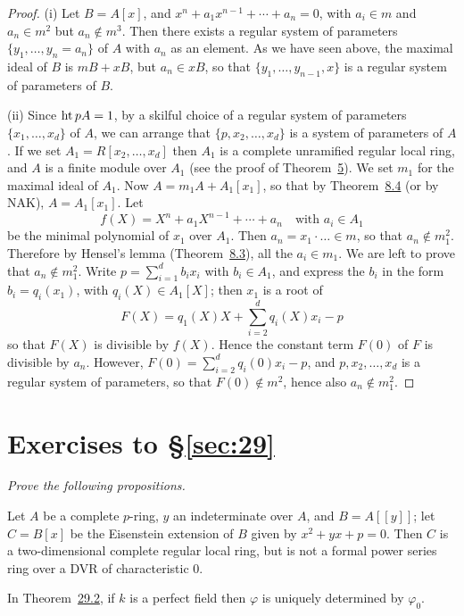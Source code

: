 \begin{proof}
(i) Let $B = A[x]$, and $x^n + a_1x^{n-1} + \cdots + a_n = 0$, with $a_i \in m$ and
$a_n \in m^2$ but $a_n \notin m^3$. Then there exists a regular system of parameters
$\{y_1, \ldots, y_n = a_n\}$ of $A$ with $a_n$ as an element. As we have seen above, the
maximal ideal of $B$ is $mB + xB$, but $a_n \in xB$, so that
$\{y_1, \ldots, y_{n-1}, x\}$ is a regular system of parameters of $B$.

(ii) Since $\operatorname{ht} pA = 1$, by a skilful choice of a regular system of parameters
$\{x_1, \ldots, x_d\}$ of $A$, we can arrange that $\{p, x_2, \ldots, x_d\}$ is a system of
parameters of $A$. If we set $A_1 = R[x_2, \ldots, x_d]$ then $A_1$ is a complete
unramified regular local ring, and $A$ is a finite module over $A_1$ (see the
proof of Theorem~\hyperref[thm:29.5]{5}). We set $m_1$ for the maximal ideal of $A_1$. Now
$A = m_1A + A_1[x_1]$, so that by Theorem~\hyperref[thm:8.4]{8.4} (or by NAK),
$A = A_1[x_1]$. Let
\[
  f(X) = X^n + a_1X^{n-1} + \cdots + a_n \quad \text{with } a_i \in A_1
\]
be the minimal polynomial of $x_1$ over $A_1$. Then $a_n = x_1 \cdot \ldots \in m$,
so that $a_n \notin m_1^2$. Therefore by Hensel's lemma (Theorem~\hyperref[thm:8.3]{8.3}), all the
$a_i \in m_1$. We are left to prove that $a_n \notin m_1^2$. Write $p = \sum_{i=1}^{d} b_ix_i$ with
$b_i \in A_1$, and express the $b_i$ in the form $b_i = q_i(x_1)$, with
$q_i(X) \in A_1[X]$; then $x_1$ is a root of
\[
  F(X) = q_1(X)X + \sum_{i=2}^{d} q_i(X)x_i - p
\]
so that $F(X)$ is divisible by $f(X)$. Hence the constant term $F(0)$ of $F$ is
divisible by $a_n$. However, $F(0) = \sum_{i=2}^{d} q_i(0)x_i - p$, and
$p, x_2, \ldots, x_d$ is a regular system of parameters, so that $F(0) \notin m^2$, hence
also $a_n \notin m_1^2$.
\end{proof}

\section*{Exercises to \S\ref{sec:29}}
\emph{Prove the following propositions.}

\begin{exercise}\label{ex:29.1-ex}
Let $A$ be a complete $p$-ring, $y$ an indeterminate over $A$, and $B = A[[y]]$; let
$C = B[x]$ be the Eisenstein extension of $B$ given by $x^2 + yx + p = 0$. Then $C$
is a two-dimensional complete regular local ring, but is not a formal power
series ring over a DVR of characteristic $0$.
\end{exercise}

\begin{exercise}\label{ex:29.2-ex}
In Theorem~\hyperref[thm:29.2]{29.2}, if $k$ is a perfect field then $\varphi$ is uniquely determined
by $\varphi_0$.
\end{exercise}
